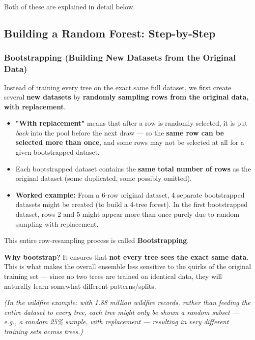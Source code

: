 \documentclass[12pt,openany]{book}
\begin{document}
Both of these are explained in detail below.

\medskip


\subsection{Building a Random Forest: Step-by-Step}


\subsubsection{Bootstrapping (Building New Datasets from the Original Data)}


Instead of training every tree on the exact same full dataset, we first create several \textbf{new datasets} by \textbf{randomly sampling rows from the original data, with replacement}.

\begin{itemize}[leftmargin=*]
    \item \textbf{"With replacement"} means that after a row is randomly selected, it is put \textit{back} into the pool before the next draw --- so the \textbf{same row can be selected more than once}, and some rows may not be selected at all for a given bootstrapped dataset.
    \item Each bootstrapped dataset contains the \textbf{same total number of rows} as the original dataset (some duplicated, some possibly omitted).
    \item \textbf{Worked example:} From a 6-row original dataset, 4 separate bootstrapped datasets might be created (to build a 4-tree forest). In the first bootstrapped dataset, rows 2 and 5 might appear more than once purely due to random sampling with replacement.

\end{itemize}

This entire row-resampling process is called \textbf{Bootstrapping}.

\textbf{Why bootstrap?} It ensures that \textbf{not every tree sees the exact same data}. This is what makes the overall ensemble less sensitive to the quirks of the original training set --- since no two trees are trained on identical data, they will naturally learn somewhat different patterns/splits.

\textit{(In the wildfire example: with 1.88 million wildfire records, rather than feeding the entire dataset to every tree, each tree might only be shown a random subset --- e.g., a random 25\% sample, with replacement --- resulting in very different training sets across trees.)}
\end{document}
